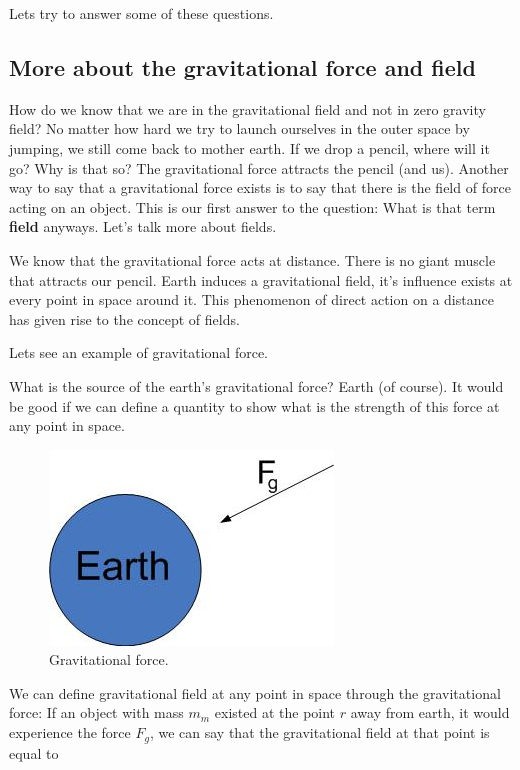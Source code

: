 \documentclass{ximera}
\begin{document}
Lets try to answer some of these questions.

\subsection{More about the gravitational force and field}

How do we know that we are in the gravitational field and not in zero gravity field? No matter how hard we try to launch ourselves in the outer space by jumping, we still come back to mother earth. If we drop a pencil, where will it go? Why is that so? The gravitational force attracts the pencil (and us).  Another way to say that a gravitational force exists is to say that there is the field of force acting on an object. This is our first answer to the question: What is that term {\bf field} anyways. Let's talk more about fields.

We know that the gravitational force acts at distance. There is no giant muscle that attracts our pencil. Earth induces a gravitational field, it's influence exists at every point in space around it. This phenomenon of direct action on a distance has given rise to the concept of fields.  

Lets see an example of gravitational force. 

What is the source of the earth's gravitational force? Earth (of course). It would be good if we can define a quantity to show what is the strength of this force at any point in space. 



\begin{figure}[htbp]
\begin{center}
\includegraphics[scale=0.5]{../jpg/earth.jpg}
\end{center}
\caption{Gravitational force.}
\label{wind}
\end{figure}






We can define gravitational field at any point in space through the gravitational force: If an object with mass $m_m$ existed at the point $r$ away from earth, it would experience the force $F_g$, we can say that the gravitational field at that point is equal to
\end{document}
